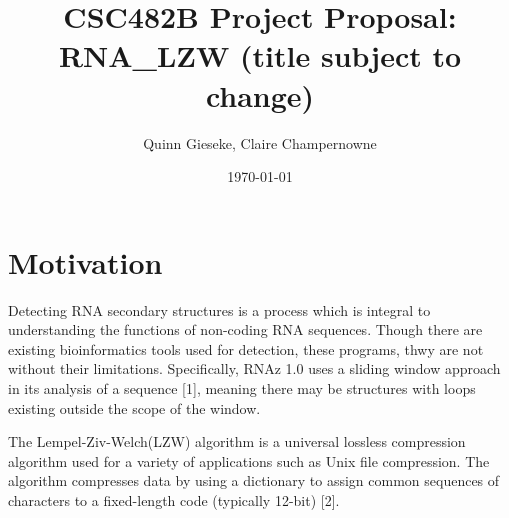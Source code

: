 \documentclass[letterpaper, 12pt]{artikel3}
\title{CSC482B Project Proposal: RNA\_LZW (title subject to change)}
\date{\today}
\author{Quinn Gieseke, Claire Champernowne}
\begin{document}
\maketitle









\vspace{-12mm}
\section*{Motivation}
Detecting RNA secondary structures is a process which is integral to understanding the functions of non-coding RNA sequences. Though there are existing bioinformatics tools used for detection, these programs, thwy are not without their limitations.  Specifically,  RNAz 1.0 uses a sliding window approach in its analysis of a sequence [1], meaning there may be structures with loops existing outside the scope of the window. 

The Lempel-Ziv-Welch(LZW) algorithm is a universal lossless compression algorithm used for a variety of applications such as Unix file compression. The algorithm compresses data by using a dictionary to assign common sequences of characters to a fixed-length code (typically 12-bit) [2].
\end{document}
